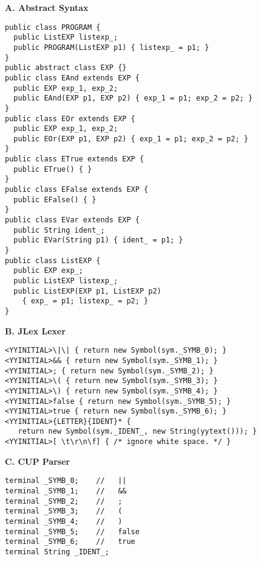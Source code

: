 \begin{figure}
\begin{boxedminipage}[t]{\textwidth}
\begin{minipage}[l]{0.5\textwidth}
\textbf{A. Abstract Syntax}
\scriptsize
\begin{verbatim}
public class PROGRAM {
  public ListEXP listexp_;
  public PROGRAM(ListEXP p1) { listexp_ = p1; }
}
public abstract class EXP {}
public class EAnd extends EXP {
  public EXP exp_1, exp_2;
  public EAnd(EXP p1, EXP p2) { exp_1 = p1; exp_2 = p2; }
}
public class EOr extends EXP {
  public EXP exp_1, exp_2;
  public EOr(EXP p1, EXP p2) { exp_1 = p1; exp_2 = p2; }
}
public class ETrue extends EXP {
  public ETrue() { }
}
public class EFalse extends EXP {
  public EFalse() { }
}
public class EVar extends EXP {
  public String ident_;
  public EVar(String p1) { ident_ = p1; }
}
public class ListEXP {
  public EXP exp_;
  public ListEXP listexp_; 
  public ListEXP(EXP p1, ListEXP p2)
    { exp_ = p1; listexp_ = p2; }
}
\end{verbatim}
\normalsize
\textbf{B. JLex Lexer}
\scriptsize
\begin{verbatim}
<YYINITIAL>\|\| { return new Symbol(sym._SYMB_0); }
<YYINITIAL>&& { return new Symbol(sym._SYMB_1); }
<YYINITIAL>; { return new Symbol(sym._SYMB_2); }
<YYINITIAL>\( { return new Symbol(sym._SYMB_3); }
<YYINITIAL>\) { return new Symbol(sym._SYMB_4); }
<YYINITIAL>false { return new Symbol(sym._SYMB_5); }
<YYINITIAL>true { return new Symbol(sym._SYMB_6); }
<YYINITIAL>{LETTER}{IDENT}* { 
   return new Symbol(sym._IDENT_, new String(yytext())); }
<YYINITIAL>[ \t\r\n\f] { /* ignore white space. */ }
\end{verbatim}
\normalsize
\textbf{C. CUP Parser}
\scriptsize
\begin{verbatim}
terminal _SYMB_0;    //   ||
terminal _SYMB_1;    //   &&
terminal _SYMB_2;    //   ;
terminal _SYMB_3;    //   (
terminal _SYMB_4;    //   )
terminal _SYMB_5;    //   false
terminal _SYMB_6;    //   true
terminal String _IDENT_;


\end{verbatim}
\end{minipage}
\end{boxedminipage}
\end{figure}

